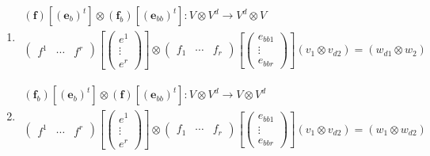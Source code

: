 \documentclass[aps,preprint]{revtex4}
\begin{document}
\begin{enumerate}
\begin{enumerate}
\item 
\begin{gather}
\left( \boldsymbol{f}\right) \left[ \left( \mathbf{e}_{b}\right) ^{t}\right]
\otimes \left( \boldsymbol{f}_{b}\right) \left[ \left( \mathbf{e}%
_{bb}\right) ^{t}\right] :V\otimes V^{d}\rightarrow V^{d}\otimes V \\
\left( 
\begin{array}{ccc}
f^{1} & \cdots & f^{r}%
\end{array}%
\right) \left[ \left( 
\begin{array}{c}
e^{1} \\ 
\vdots \\ 
e^{r}%
\end{array}%
\right) \right] \otimes \left( 
\begin{array}{ccc}
f_{1} & \cdots & f_{r}%
\end{array}%
\right) \left[ \left( 
\begin{array}{c}
e_{bb1} \\ 
\vdots \\ 
e_{bbr}%
\end{array}%
\right) \right] \left( v_{1}\otimes v_{d2}\right) =\left( w_{d1}\otimes
w_{2}\right)
\end{gather}

\item 
\begin{gather}
\left( \boldsymbol{f}_{b}\right) \left[ \left( \mathbf{e}_{b}\right) ^{t}%
\right] \otimes \left( \boldsymbol{f}\right) \left[ \left( \mathbf{e}%
_{bb}\right) ^{t}\right] :V\otimes V^{d}\rightarrow V\otimes V^{d} \\
\left( 
\begin{array}{ccc}
f^{1} & \cdots & f^{r}%
\end{array}%
\right) \left[ \left( 
\begin{array}{c}
e^{1} \\ 
\vdots \\ 
e^{r}%
\end{array}%
\right) \right] \otimes \left( 
\begin{array}{ccc}
f_{1} & \cdots & f_{r}%
\end{array}%
\right) \left[ \left( 
\begin{array}{c}
e_{bb1} \\ 
\vdots \\ 
e_{bbr}%
\end{array}%
\right) \right] \left( v_{1}\otimes v_{d2}\right) =\left( w_{1}\otimes
w_{d2}\right)
\end{gather}


\end{enumerate}
\end{enumerate}
\end{document}
